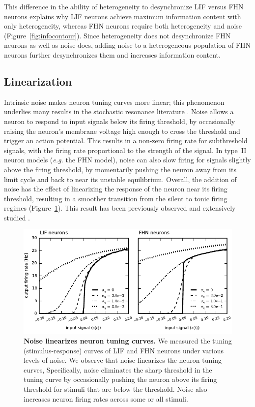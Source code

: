 \documentclass[12pt]{article}
\begin{document}
This difference in the ability of heterogeneity to desynchronize LIF versus FHN neurons
explains why LIF neurons achieve maximum information content with only heterogeneity,
whereas FHN neurons require both heterogeneity and noise (Figure~\ref{fig:infocontour}).
Since heterogeneity does not desynchronize FHN neurons as well as noise does,
adding noise to a heterogeneous population of FHN neurons further desynchronizes them
and increases information content.

\subsection{Linearization}

Intrinsic noise makes neuron tuning curves more linear;
this phenomenon underlies many results in the stochastic resonance literature
\citep{Chialvo1997}.
Noise allows a neuron to respond to input signals below its firing threshold,
by occasionally raising the neuron's membrane voltage high enough
to cross the threshold and trigger an action potential.
This results in a non-zero firing rate for subthreshold signals,
with the firing rate proportional to the strength of the signal.
In type~II neuron models (\emph{e.g.} the FHN model),
noise can also slow firing for signals slightly above the firing threshold,
by momentarily pushing the neuron away from its limit cycle and back to near its unstable equilibrium.
Overall, the addition of noise has the effect
of linearizing the response of the neuron near its firing threshold,
resulting in a smoother transition from the silent to tonic firing regimes (Figure~\ref{fig:tuning}).
This result has been previously observed and extensively studied \citep{Stocks1996,Chialvo1997,Chance2002,Prescott2002,Shu2003}.

\begin{figure}
  \ifx\hidefigures\undefined
    \centering
    \includegraphics[width=\textwidth]{figure7_tuningnoisy.pdf}
  \fi
  \caption{
    \textbf{Noise linearizes neuron tuning curves.}
    We measured the tuning (stimulus-response) curves of LIF and FHN neurons under various levels of noise.
    We observe that noise linearizes the neuron tuning curves,
    Specifically, noise eliminates the sharp threshold in the tuning curve by
    occasionally pushing the neuron above its firing threshold
    for stimuli that are below the threshold.
    Noise also increases neuron firing rates across some or all stimuli.
  }
  \label{fig:tuning}
\end{figure}
\end{document}
